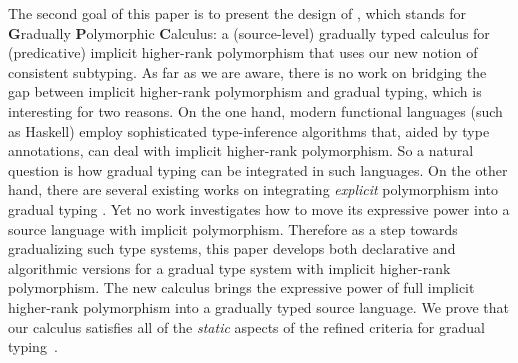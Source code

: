 
\begin{comment}
To further validate our revised notion of consistent subtyping, we
show that it coincides with the notion of consistent subtyping for an
extension of Garcia et al.'s \emph{Abstracting Gradual Typing} (AGT)
(2016) with polymorphism.
\end{comment}

The second goal of this paper is to present the design of \name, which
stands for \textbf{G}radually \textbf{P}olymorphic \textbf{C}alculus: a
(source-level) gradually typed calculus for (predicative) implicit higher-rank
polymorphism that uses our new notion of consistent subtyping. As far as we are
aware, there is no work on bridging the gap between implicit higher-rank
polymorphism and gradual typing, which is interesting for two reasons. On the
one hand, %
modern functional languages (such as Haskell) employ sophisticated
type-inference algorithms that, aided by type annotations, can deal with
implicit higher-rank polymorphism. So a natural question is how gradual typing
can be integrated in such languages. On the other hand, there are several
existing works on integrating \emph{explicit} polymorphism into gradual typing
\citep{ahmed2011blame, yuu2017poly}. Yet no work investigates how to move its
expressive power into a source language with implicit polymorphism.
Therefore as a step towards gradualizing such type systems, this paper develops
both declarative and algorithmic versions for a gradual type system with
implicit higher-rank polymorphism. The new calculus brings the expressive power
of full implicit higher-rank polymorphism into a gradually typed source language.
We prove that our calculus satisfies all of the \emph{static} aspects of the
refined criteria for gradual typing~\cite{siek2015refined}.

